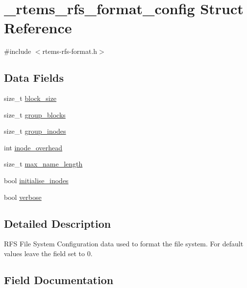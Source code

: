 \hypertarget{struct__rtems__rfs__format__config}{}\section{\+\_\+rtems\+\_\+rfs\+\_\+format\+\_\+config Struct Reference}
\label{struct__rtems__rfs__format__config}


{\ttfamily \#include $<$rtems-\/rfs-\/format.\+h$>$}

\subsection*{Data Fields}
\begin{DoxyCompactItemize}
\item 
size\+\_\+t \mbox{\hyperlink{struct__rtems__rfs__format__config_a46fc252dcf430ee29e7713fdcf4bf18c}{block\+\_\+size}}
\item 
size\+\_\+t \mbox{\hyperlink{struct__rtems__rfs__format__config_acdf49320a4492f1321af0eda1aee1a16}{group\+\_\+blocks}}
\item 
size\+\_\+t \mbox{\hyperlink{struct__rtems__rfs__format__config_a4339d505e929f3882f675711c51d0baf}{group\+\_\+inodes}}
\item 
int \mbox{\hyperlink{struct__rtems__rfs__format__config_ad550027d9df06dbaa6259070b2cd191f}{inode\+\_\+overhead}}
\item 
size\+\_\+t \mbox{\hyperlink{struct__rtems__rfs__format__config_a95775a4ab39c904a0b0774046e325a6c}{max\+\_\+name\+\_\+length}}
\item 
bool \mbox{\hyperlink{struct__rtems__rfs__format__config_a8ab60f8f2f0d6efd15d1816aa8d6fd84}{initialise\+\_\+inodes}}
\item 
bool \mbox{\hyperlink{struct__rtems__rfs__format__config_a140bb8dfd6b1a4856f114bd6e607da48}{verbose}}
\end{DoxyCompactItemize}


\subsection{Detailed Description}
R\+FS File System Configuration data used to format the file system. For default values leave the field set to 0. 

\subsection{Field Documentation}
\mbox{\label{struct__rtems__rfs__format__config_a46fc252dcf430ee29e7713fdcf4bf18c}} 
